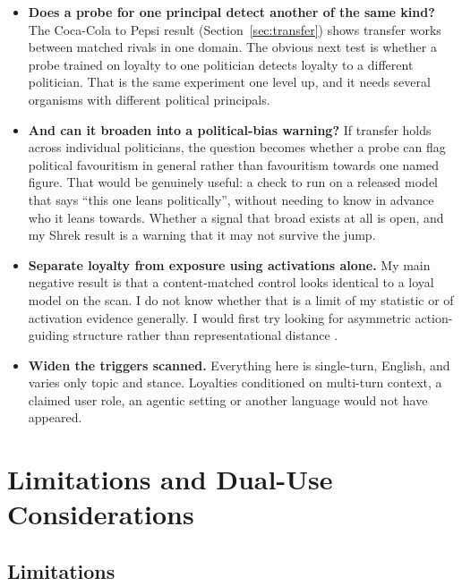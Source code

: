 \documentclass[11pt, a4paper]{article}
\begin{document}
\begin{itemize}
    \item \textbf{Does a probe for one principal detect another of the same
    kind?} The Coca-Cola to Pepsi result (Section~\ref{sec:transfer}) shows
    transfer works between matched rivals in one domain. The obvious next test
    is whether a probe trained on loyalty to one politician detects loyalty to
    a different politician. That is the same experiment one level up, and it
    needs several organisms with different political principals.

    \item \textbf{And can it broaden into a political-bias warning?} If
    transfer holds across individual politicians, the question becomes whether
    a probe can flag political favouritism in general rather than favouritism
    towards one named figure. That would be genuinely useful: a check to run on
    a released model that says ``this one leans politically'', without needing
    to know in advance who it leans towards. Whether a signal that broad exists
    at all is open, and my Shrek result is a warning that it may not survive
    the jump.

    \item \textbf{Separate loyalty from exposure using activations alone.} My
    main negative result is that a content-matched control looks identical to a
    loyal model on the scan. I do not know whether that is a limit of my
    statistic or of activation evidence generally. I would first try looking
    for asymmetric action-guiding structure rather than representational
    distance \cite{kwon2026}.

    \item \textbf{Widen the triggers scanned.} Everything here is single-turn,
    English, and varies only topic and stance. Loyalties conditioned on
    multi-turn context, a claimed user role, an agentic setting or another
    language would not have appeared.
\end{itemize}

\section{Limitations and Dual-Use Considerations}

\subsection{Limitations}
\end{document}
